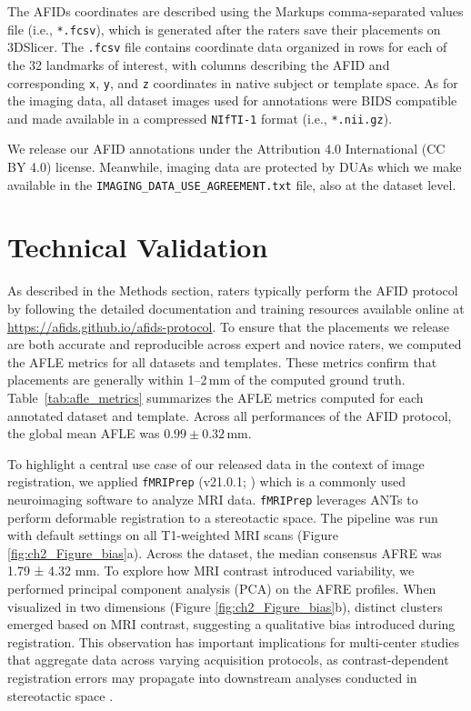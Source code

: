 The AFIDs coordinates are described using the Markups comma-separated values file (i.e., \texttt{*.fcsv}), which is generated after the raters save their placements on 3DSlicer. The \texttt{.fcsv} file contains coordinate data organized in rows for each of the 32 landmarks of interest, with columns describing the AFID and corresponding \texttt{x}, \texttt{y}, and \texttt{z} coordinates in native subject or template space. As for the imaging data, all dataset images used for annotations were BIDS compatible and made available in a compressed \texttt{NIfTI-1} format (i.e., \texttt{*.nii.gz}).

We release our AFID annotations under the Attribution 4.0 International (CC BY 4.0) license. Meanwhile, imaging data are protected by DUAs which we make available in the \texttt{IMAGING\_DATA\_USE\_AGREEMENT.txt} file, also at the dataset level.


\section{Technical Validation}
As described in the Methods section, raters typically perform the AFID protocol by following the detailed documentation and training resources available online at \url{https://afids.github.io/afids-protocol}. To ensure that the placements we release are both accurate and reproducible across expert and novice raters, we computed the AFLE metrics for all datasets and templates. These metrics confirm that placements are generally within 1–2\,mm of the computed ground truth. Table~\ref{tab:afle_metrics} summarizes the AFLE metrics computed for each annotated dataset and template. Across all performances of the AFID protocol, the global mean AFLE was $0.99 \pm 0.32$\,mm.

To highlight a central use case of our released data in the context of image registration, we applied \texttt{fMRIPrep} (v21.0.1; \cite{Esteban2019-oz}) which is a commonly used neuroimaging software to analyze MRI data. \texttt{fMRIPrep} leverages ANTs \cite{Avants2008-ek} to perform deformable registration to a stereotactic space. The pipeline was run with default settings on all T1-weighted MRI scans (Figure \ref{fig:ch2_Figure_bias}a). Across the dataset, the median consensus AFRE was 1.79 ± 4.32 mm. To explore how MRI contrast introduced variability, we performed principal component analysis (PCA) on the AFRE profiles. When visualized in two dimensions (Figure \ref{fig:ch2_Figure_bias}b), distinct clusters emerged based on MRI contrast, suggesting a qualitative bias introduced during registration. This observation has important implications for multi-center studies that aggregate data across varying acquisition protocols, as contrast-dependent registration errors may propagate into downstream analyses conducted in stereotactic space \cite{Hollunder2024-wc,Middlebrooks2024-gb}.

